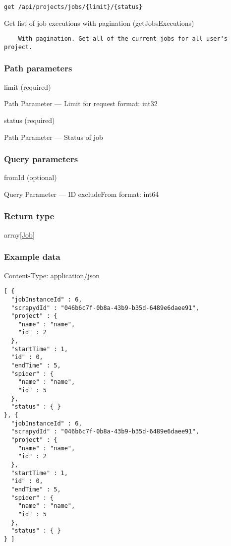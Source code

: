\begin{verbatim}
get /api/projects/jobs/{limit}/{status}
\end{verbatim}

Get list of job executions with pagination ({getJobsExecutions})

\begin{verbatim}
    With pagination. Get all of the current jobs for all user's project.
\end{verbatim}

\hypertarget{path-parameters-7}{%
\subsubsection*{Path parameters}\label{path-parameters-7}}

limit (required)

{Path Parameter} --- Limit for request format: int32

status (required)

{Path Parameter} --- Status of job

\hypertarget{query-parameters-1}{%
\subsubsection*{Query parameters}\label{query-parameters-1}}

fromId (optional)

{Query Parameter} --- ID excludeFrom format: int64

\hypertarget{return-type-9}{%
\subsubsection*{Return type}\label{return-type-9}}

array{[}\protect\hyperlink{Job}{Job}{]}

\hypertarget{example-data-9}{%
\subsubsection*{Example data}\label{example-data-9}}

Content-Type: application/json

\begin{verbatim}
[ {
  "jobInstanceId" : 6,
  "scrapydId" : "046b6c7f-0b8a-43b9-b35d-6489e6daee91",
  "project" : {
    "name" : "name",
    "id" : 2
  },
  "startTime" : 1,
  "id" : 0,
  "endTime" : 5,
  "spider" : {
    "name" : "name",
    "id" : 5
  },
  "status" : { }
}, {
  "jobInstanceId" : 6,
  "scrapydId" : "046b6c7f-0b8a-43b9-b35d-6489e6daee91",
  "project" : {
    "name" : "name",
    "id" : 2
  },
  "startTime" : 1,
  "id" : 0,
  "endTime" : 5,
  "spider" : {
    "name" : "name",
    "id" : 5
  },
  "status" : { }
} ]
\end{verbatim}

